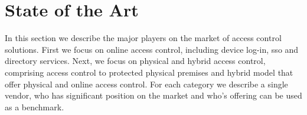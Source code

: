 \section{State of the Art}

In this section we describe the major players on the market of access control solutions. First we focus on online access control, including device log-in, \acrshort{sso} and directory services. Next, we focus on physical and hybrid access control, comprising access control to protected physical premises and hybrid model that offer physical and online access control. For each category we describe a single vendor, who has significant position on the market and who's offering can be used as a benchmark.


